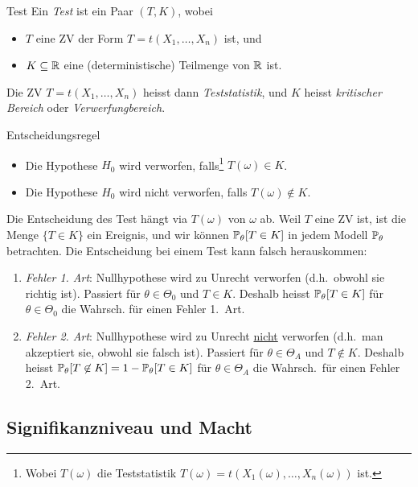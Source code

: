 \begin{definition}{Test}
	Ein \emph{Test} ist ein Paar $(T,K)$, wobei
	\begin{itemize}
		\item $T$ eine ZV der Form $T = t(X_1 , \ldots , X_n)$ ist, und
		\item $K \subseteq \mathbb{R}$ eine (deterministische) Teilmenge von $\mathbb{R}$ ist.
	\end{itemize}
	Die ZV $T = t(X_1 , \ldots , X_n)$ heisst dann \emph{Teststatistik}, und $K$ heisst \emph{kritischer Bereich} oder
	\emph{Verwerfungbereich}.
\end{definition}
\begin{lemma}{Entscheidungsregel}
	\begin{itemize}
		\item Die Hypothese $H_0$ wird verworfen, falls\footnote{Wobei $T(\omega)$ die Teststatistik $T(\omega) = t(X_1
			(\omega) , \ldots , X_n (\omega))$ ist.} $T(\omega) \in K$.
		\item Die Hypothese $H_0$ wird nicht verworfen, falls $T(\omega) \not\in K$.
	\end{itemize}
\end{lemma}
Die Entscheidung des Test hängt via $T(\omega)$ von $\omega$ ab. Weil $T$ eine ZV ist, ist die Menge $\{T \in K\}$ ein
Ereignis, und wir können $\mathbb{P}_\theta [T \in K]$ in jedem Modell $\mathbb{P}_\theta$ betrachten. Die Entscheidung bei einem Test
kann falsch herauskommen:
\begin{enumerate}
	\item \emph{Fehler 1. Art}: Nullhypothese wird zu Unrecht verworfen (d.h.\ obwohl sie richtig ist). Passiert für
		$\theta \in \Theta_0$ und $T \in K$. Deshalb heisst $\mathbb{P}_\theta [T \in K]$ für $\theta \in \Theta_0$ die
		Wahrsch. für einen Fehler 1.\ Art. 
	\item \emph{Fehler 2. Art}: Nullhypothese wird zu Unrecht \underline{nicht} verworfen (d.h.\ man akzeptiert sie,
		obwohl sie falsch ist). Passiert für $\theta \in \Theta_A$ und $T \not\in K$. Deshalb heisst 
		$\mathbb{P}_\theta [T \not\in K] = 1 - \mathbb{P}_\theta [T \in K]$ für $\theta \in \Theta_A$ die Wahrsch.\ für einen Fehler 2.\ Art. 
\end{enumerate}


\subsection*{Signifikanzniveau und Macht}%
\label{sub:signifikanzniveau_und_macht}

